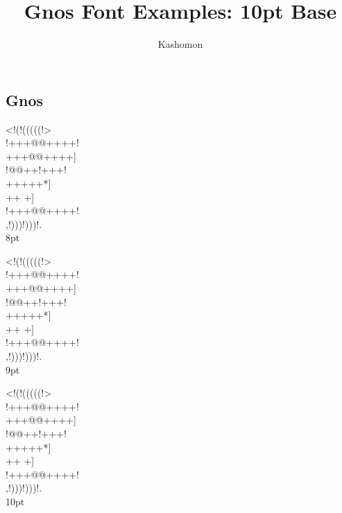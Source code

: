 \documentclass[10pt]{article}
\begin{document}
\title{Gnos Font Examples: 10pt Base}
\author{Kashomon}
\maketitle

\begin{center}
\section*{Gnos}
{
\gnos%
<!(!(((((!>\\
!+++@@++++!\\
+++@@++++]\\
!@@++!+++!\\
+++++*]\\
++
+]\\
!+++@@++++!\\
,!)))!)))!.\\
}
8pt

{
\gnos%
<!(!(((((!>\\
!+++@@++++!\\
+++@@++++]\\
!@@++!+++!\\
+++++*]\\
++
+]\\
!+++@@++++!\\
,!)))!)))!.\\
}
9pt


{
\gnos%
<!(!(((((!>\\
!+++@@++++!\\
+++@@++++]\\
!@@++!+++!\\
+++++*]\\
++
+]\\
!+++@@++++!\\
,!)))!)))!.\\
}
10pt

\newpage


\end{center}
\end{document}
